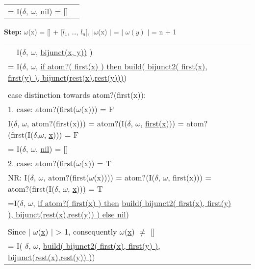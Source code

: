 \documentclass[10pt, a4paper]{article}
\begin{document}
\begin{description}
\begin{tabular}{ l l }
           = I($\delta$, $\omega$, \underline{nil}) = [] & \\
        \end{tabular}
        
    \item \textbf{Step:} $\omega$(x) = [] + [$l_1$, \dots, $l_n$], $\vert\omega$(x) $\vert$ = $\vert$
    $\omega(y)$ $\vert$ = n + 1
    
    \begin{tabular}{ l l l } %
        \textcolor{white}{=} I($\delta$, $\omega$, \underline{bijunct(x, y))} )       &     \\
        = I($\delta$, $\omega$, \underline{if atom?( first(x) ) then 
        build( bijunct2( first(x), first(y) ), bijunct(rest(x),rest(y)))})  & \\ \\

        case distinction towards atom?(first(x)):  & \\

        \noindent\hspace*{5mm} 1. case: atom?(first($\omega$(x))) = F & \\
        \noindent\hspace*{10mm} I($\delta$, $\omega$, atom?(first(x))) = atom?(I($\delta$, $\omega$,
        \underline{first(x)}))
        = atom?(first(I($\delta$,$\omega$, \underline{x}))) = F \\
        \noindent\hspace*{10mm} = I($\delta$, $\omega$, \underline{nil}) = [] \\

        \noindent\hspace*{5mm} 2. case: atom?(first($\omega$(x)) = T & \\
        \noindent\hspace*{10mm} NR: I($\delta$, $\omega$, atom?(first($\omega$(x)))) = 
        atom?(I($\delta$, $\omega$, first(x)))
        = atom?(first(I($\delta$, $\omega$, \underline{x}))) = T \\

        \noindent\hspace*{8mm} =I($\delta$, $\omega$, \underline{if atom?( first(x) ) then} 
        \underline{build( bijunct2( first(x), first(y) ), bijunct(rest(x),rest(y)) ) else nil}) \\ \\

        \noindent\hspace*{8mm} Since $\vert$ $\omega$(\underline{x}) $\vert$ > 1, consequently
        $\omega$(\underline{x}) $\neq$ [] \\
        \noindent\hspace*{8mm} = I( $\delta$, $\omega$, \underline{build( bijunct2( first(x), first(y) ),
        bijunct(rest(x),rest(y)) )}) \\



\end{tabular}
\end{description}
\end{document}
